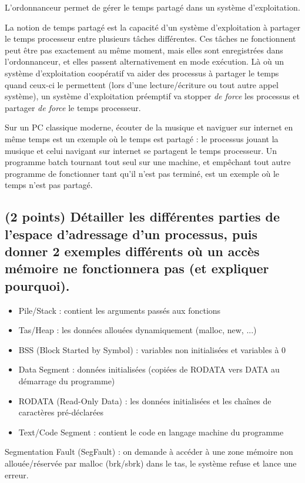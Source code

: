 \documentclass[11pt,a4paper]{article}
\begin{document}
\bigskip
L'ordonnanceur permet de gérer le temps partagé dans un système d'exploitation.

La notion de temps partagé est la capacité d'un système d'exploitation à partager le temps processeur entre plusieurs tâches différentes.
Ces tâches ne fonctionnent peut être pas exactement au même moment, mais elles sont enregistrées dans l'ordonnanceur, et elles passent alternativement en mode exécution.
Là où un système d'exploitation coopératif va aider des processus à partager le temps quand ceux-ci le permettent (lors d'une lecture/écriture ou tout autre appel système), un système d'exploitation préemptif va stopper \textit{de force} les processus et partager \textit{de force} le temps processeur.

Sur un PC classique moderne, écouter de la musique et naviguer sur internet en même temps est un exemple où le temps est partagé : le processus jouant la musique et celui navigant sur internet se partagent le temps processeur.
Un programme batch tournant tout seul sur une machine, et empêchant tout autre programme de fonctionner tant qu'il n'est pas terminé, est un exemple où le temps n'est pas partagé.
\bigskip

\subsection{(2 points) Détailler les différentes parties de l'espace d'adressage d'un processus, puis donner 2 exemples différents où un accès mémoire ne fonctionnera pas (et expliquer pourquoi).}

\bigskip
\begin{itemize}
\item Pile/Stack : contient les arguments passés aux fonctions
\item Tas/Heap : les données allouées dynamiquement (malloc, new, ...)
\item BSS (Block Started by Symbol) : variables non initialisées et variables à 0
\item Data Segment : données initialisées (copiées de RODATA vers DATA au démarrage du programme)
\item RODATA (Read-Only Data) : les données initialisées et les chaînes de caractères pré-déclarées
\item Text/Code Segment : contient le code en langage machine du programme
\end{itemize}
\bigskip

Segmentation Fault (SegFault) : on demande à accéder à une zone mémoire non allouée/réservée par malloc (brk/sbrk) dans le tas, le système refuse et lance une erreur.
\end{document}
